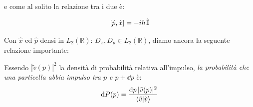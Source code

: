 	e come al solito la relazione tra i due è:

\begin{align*}
	\qty[\hat{p}, \hat{x}] = - i \hbar \, \hat{\mathbb{I}}
\end{align*}
	
	Con $\hat{x}$ ed $\hat{p}$ densi in $L_2(\mathbb{R})$: $D_{\hat{x}}, D_{\hat{p}} \in L_2(\mathbb{R})$, diamo ancora la seguente relazione importante:
	
\begin{nb}
	Essendo $|\tilde{v}(p)|^2$ la densità di probabilità relativa all'impulso, \textit{la probabilità che una particella abbia impulso tra $p$ e $p + \dd p$} è:
\begin{align*}
	\dd P(p) = \frac{\dd p \, |\tilde{v}(p)|^2}{\braket{\tilde{v}}}
\end{align*}
\end{nb}





